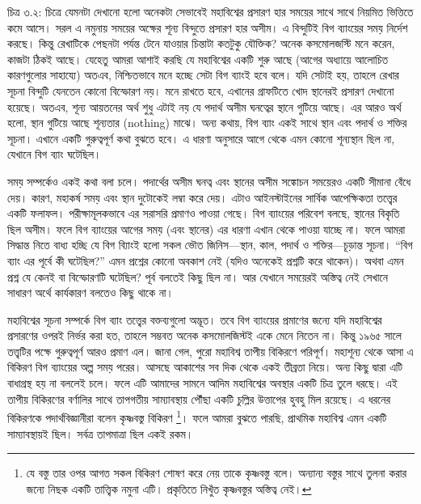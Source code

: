 \documentclass[
]{book}
\begin{document}
চিত্র ৩.২: চিত্রে যেমনটা দেখানো হলো অনেকটা সেভাবেই মহাবিশ্বের প্রসারণ হার সময়ের সাথে সাথে নিয়মিত ভিত্তিতে কমে আসে। সরল এ নমুনায় সময়ের অক্ষের শূন্য বিন্দুতে প্রসারণ হার অসীম। এ বিন্দুটিই বিগ ব্যাংয়ের সময় নির্দেশ করছে।
কিন্তু রেখাটিকে পেছনটা পর্যন্ত টেনে যাওয়ার চিন্তাটা কতটুকু যৌক্তিক? অনেক কসমোলজস্টি মনে করেন, কাজটা ঠিকই আছে। যেহেতু আমরা আশাই করছি যে মহাবিশ্বের একটি শুরু আছে (আগের অধ্যায়ে আলোচিত কারণগুলোর সাহায্যে) অতএব, নিশ্চিতভাবে মনে হচ্ছে সেটা বিগ ব্যাংই হবে বলে। যদি সেটাই হয়, তাহলে রেখার সূচনা বিন্দুটি যেনতেন কোনো বিস্ফোরণ নয়। মনে রাখতে হবে, এখানের গ্রাফটিতে খোদ স্থানেরই প্রসারণ দেখানো হয়েছে। অতএব, শূন্য আয়তনের অর্থ শুধু এটাই নয় যে পদার্থ অসীম ঘনত্বের স্থানে গুটিয়ে আছে। এর আরও অর্থ হলো, স্থান গুটিয়ে আছে শূন্যতার (nothing) মাঝে। অন্য কথায়, বিগ ব্যাং একই সাথে স্থান এবং পদার্থ ও শক্তির সূচনা। এখানে একটি গুরুত্বপূর্ণ কথা বুঝতে হবে। এ ধারণা অনুসারে আগে থেকে এমন কোনো শূন্যস্থান ছিল না, যেখানে বিগ ব্যাং ঘটেছিল।

সময় সম্পর্কেও একই কথা বলা চলে। পদার্থের অসীম ঘনত্ব এবং স্থানের অসীম সঙ্কোচন সময়েরও একটি সীমানা বেঁধে দেয়। কারণ, মহাকর্ষ সময় এবং স্থান দুটোকেই লম্বা করে দেয়। এটাও আইনস্টাইনের সার্বিক আপেক্ষিকতা তত্ত্বের একটি ফলাফল। পরীক্ষামূলকভাবে এর সরাসরি প্রমাণও পাওয়া গেছে। বিগ ব্যাংয়ের পরিবেশ বলছে, স্থানের বিকৃতি ছিল অসীম। ফলে বিগ ব্যাংয়ের আগের সময় (এবং স্থানের) এর ধারণা এখান থেকে পাওয়া যাচ্ছে না। ফলে আমরা সিদ্ধান্ত নিতে বাধ্য হচ্ছি যে বিগ ব্যািংই হলো সকল ভৌত জিনিস---স্থান, কাল, পদার্থ ও শক্তির---চূড়ান্ত সূচনা। ``বিগ ব্যাং এর পূর্বে কী ঘটেছিল?'' এমন প্রশ্নের কোনো অবকাশ নেই (যদিও অনেকেই প্রশ্নটি করে থাকেন)। অথবা এমন প্রশ্ন যে কেনই বা বিস্ফোরণটি ঘটেছিল? পূর্ব বলতেই কিছু ছিল না। আর যেখানে সময়েরই অস্তিত্ব নেই সেখানে সাধারণ অর্থে কার্যকারণ বলতেও কিছু থাকে না।

মহাবিশ্বের সূচনা সম্পর্কে বিগ ব্যাং তত্ত্বের বক্তব্যগুলো অদ্ভূত। তবে বিগ ব্যাংয়ের প্রমাণের জন্যে যদি মহাবিশ্বের প্রসারণের ওপরই নির্ভর করা হত, তাহলে সম্ভবত অনেক কসমোলজিস্টই একে মেনে নিতেন না। কিন্তু ১৯৬৫ সালে তত্ত্বটির পক্ষে গুরুত্বপূর্ণ আরও প্রমাণ এল। জানা গেল, পুরো মহাবিশ্ব তাপীয় বিকিরণে পরিপূর্ণ। মহাশূন্য থেকে আসা এ বিকিরণ বিগ ব্যাংয়ের অল্প সময় পরের। আসছে আকাশের সব দিক থেকে একই তীব্রতা নিয়ে। অন্য কিছু দ্বারা এটি বাধাগ্রস্থ হয় না বললেই চলে। ফলে এটি আমাদের সামনে আদিম মহাবিশ্বের অবস্থার একটি চিত্র তুলে ধরছে। এই তাপীয় বিকিরণের বর্ণালির সাথে তাপগতীয় সাম্যাবস্থায় পৌঁছা একটি চুল্লির উত্তাপের হুবহু মিল রয়েছে। এ ধরনের বিকিরণকে পদার্থবিজ্ঞানীরা বলেন কৃষ্ণবস্তু বিকিরণ \footnote{যে বস্তু তার ওপর আগত সকল বিকিরণ শোষণ করে নেয় তাকে কৃষ্ণবস্তু বলে। অন্যান্য বস্তুর সাথে তুলনা করার জন্যে নিছক একটি তাত্ত্বিক নমুনা এটি। প্রকৃতিতে নিখুঁত কৃষ্ণবস্তুর অস্তিত্ব নেই।}। ফলে আমরা বুঝতে পারছি, প্রাথমিক মহাবিশ্ব এমন একটি সাম্যাবস্থায়ই ছিল। সর্বত্র তাপমাত্রা ছিল একই রকম।
\end{document}
